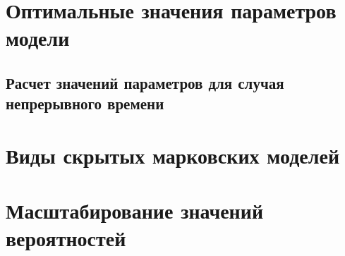 \documentclass{beamer}
\begin{document}
\section{Оптимальные значения параметров модели}
\subsection{Расчет значений параметров для случая непрерывного времени}

\section{Виды скрытых марковских моделей}

\section{Масштабирование значений вероятностей}
\end{document}
